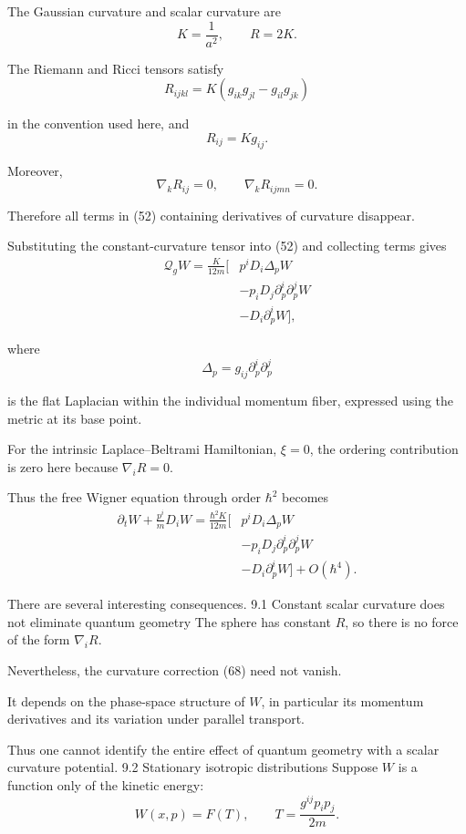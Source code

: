 The Gaussian curvature and scalar curvature are
\[
K=\frac1{a^2},
\qquad
R=2K.
\tag{64}
\]

The Riemann and Ricci tensors satisfy
\[
R_{ijkl}=K(g_{ik}g_{jl}-g_{il}g_{jk})
\tag{65}
\]

in the convention used here, and
\[
R_{ij}=Kg_{ij}.
\tag{66}
\]

Moreover,
\[
\nabla_kR_{ij}=0,
\qquad
\nabla_kR_{ijmn}=0.
\tag{67}
\]

Therefore all terms in (52) containing derivatives of curvature disappear.

Substituting the constant-curvature tensor into (52) and collecting terms gives
\[
\boxed{
\begin{aligned}
\mathcal Q_gW
=
\frac{K}{12m}\bigg[
&p^iD_i\Delta_pW\\
&-p_iD_j\partial_p^i\partial_p^jW\\
&-D_i\partial_p^iW
\bigg],
\end{aligned}
}
\tag{68}
\]

where
\[
\Delta_p=g_{ij}\partial_p^i\partial_p^j
\tag{69}
\]

is the flat Laplacian within the individual momentum fiber, expressed using the metric at its base point.

For the intrinsic Laplace–Beltrami Hamiltonian, \(\xi=0\), the ordering contribution is zero here because \(\nabla_iR=0\).

Thus the free Wigner equation through order \(\hbar^2\) becomes
\[
\boxed{
\begin{aligned}
\partial_tW+\frac{p^i}{m}D_iW
=
\frac{\hbar^2K}{12m}
\big[
&p^iD_i\Delta_pW\\
&-p_iD_j\partial_p^i\partial_p^jW\\
&-D_i\partial_p^iW
\big]
+O(\hbar^4).
\end{aligned}
}
\tag{70}
\]

There are several interesting consequences.
9.1 Constant scalar curvature does not eliminate quantum geometry
The sphere has constant \(R\), so there is no force of the form \(\nabla_iR\).

Nevertheless, the curvature correction (68) need not vanish.

It depends on the phase-space structure of \(W\), in particular its momentum derivatives and its variation under parallel transport.

Thus one cannot identify the entire effect of quantum geometry with a scalar curvature potential.
9.2 Stationary isotropic distributions
Suppose \(W\) is a function only of the kinetic energy:
\[
W(x,p)=F(T),
\qquad
T=\frac{g^{ij}p_ip_j}{2m}.
\tag{71}
\]

